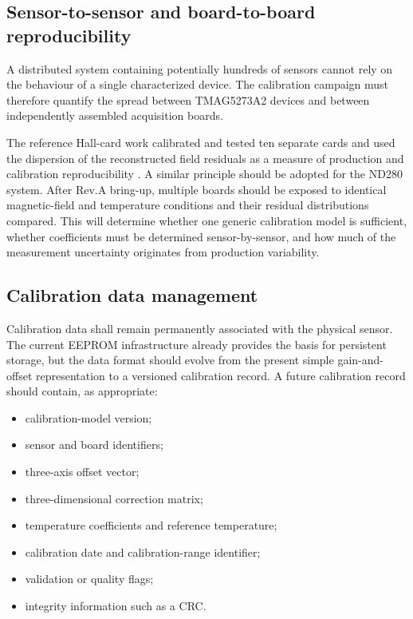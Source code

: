 \subsection{Sensor-to-sensor and board-to-board reproducibility}

A distributed system containing potentially hundreds of sensors cannot rely on the behaviour of a single characterized device. The calibration campaign must therefore quantify the spread between TMAG5273A2 devices and between independently assembled acquisition boards.

The reference Hall-card work calibrated and tested ten separate cards and used the dispersion of the reconstructed field residuals as a measure of production and calibration reproducibility \cite{MessnerHallCalibration}. A similar principle should be adopted for the ND280 system. After Rev.A bring-up, multiple boards should be exposed to identical magnetic-field and temperature conditions and their residual distributions compared. This will determine whether one generic calibration model is sufficient, whether coefficients must be determined sensor-by-sensor, and how much of the measurement uncertainty originates from production variability.

\subsection{Calibration data management}

Calibration data shall remain permanently associated with the physical sensor. The current EEPROM infrastructure already provides the basis for persistent storage, but the data format should evolve from the present simple gain-and-offset representation to a versioned calibration record. A future calibration record should contain, as appropriate:

\begin{itemize}[leftmargin=*]
\item calibration-model version;
\item sensor and board identifiers;
\item three-axis offset vector;
\item three-dimensional correction matrix;
\item temperature coefficients and reference temperature;
\item calibration date and calibration-range identifier;
\item validation or quality flags;
\item integrity information such as a CRC.
\end{itemize}

